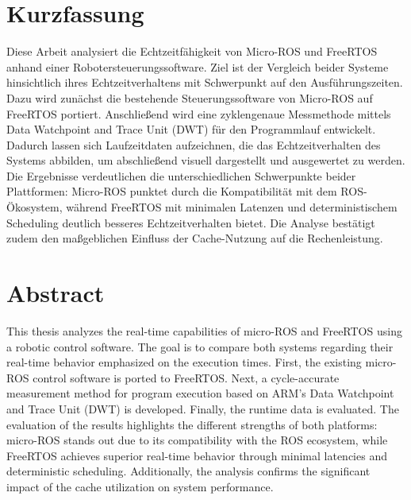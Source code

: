 \section*{Kurzfassung}

Diese Arbeit analysiert die Echtzeitfähigkeit von Micro-ROS und FreeRTOS anhand
einer Robotersteuerungssoftware. Ziel ist der Vergleich beider Systeme
hinsichtlich ihres Echtzeitverhaltens mit Schwerpunkt auf den Ausführungszeiten.
Dazu wird zunächst die bestehende Steuerungssoftware von Micro-ROS auf FreeRTOS
portiert. Anschließend wird eine zyklengenaue Messmethode mittels Data
Watchpoint and Trace Unit (DWT) für den Programmlauf entwickelt. Dadurch lassen
sich Laufzeitdaten aufzeichnen, die das Echtzeitverhalten des Systems abbilden,
um abschließend visuell dargestellt und ausgewertet zu werden. Die Ergebnisse
verdeutlichen die unterschiedlichen Schwerpunkte beider Plattformen: Micro-ROS
punktet durch die Kompatibilität mit dem ROS-Ökosystem, während FreeRTOS mit
minimalen Latenzen und deterministischem Scheduling deutlich besseres
Echtzeitverhalten bietet. Die Analyse bestätigt zudem den maßgeblichen Einfluss
der Cache-Nutzung auf die Rechenleistung.

\section*{Abstract}

This thesis analyzes the real-time capabilities of micro-ROS and FreeRTOS using
a robotic control software. The goal is to compare both systems regarding their
real-time behavior emphasized on the execution times. First, the existing
micro-ROS control software is ported to FreeRTOS. Next, a cycle-accurate
measurement method for program execution based on ARM's Data Watchpoint and
Trace Unit (DWT) is developed. Finally, the runtime data is evaluated. The
evaluation of the results highlights the different strengths of both platforms:
micro-ROS stands out due to its compatibility with the ROS ecosystem, while
FreeRTOS achieves superior real-time behavior through minimal latencies and
deterministic scheduling. Additionally, the analysis confirms the significant
impact of the cache utilization on system performance.

